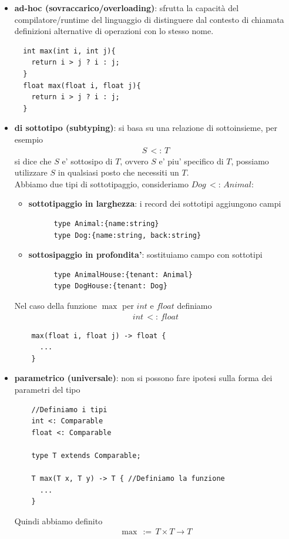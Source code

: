 \documentclass[a4paper,12pt]{article}
\begin{document}
\begin{itemize}
  \item \textbf{ad-hoc (sovraccarico/overloading)}: sfrutta la capacità del compilatore/runtime del linguaggio di
distinguere dal contesto di chiamata definizioni alternative di operazioni con
lo stesso nome.
\begin{lstlisting}
  int max(int i, int j){
    return i > j ? i : j;
  }
  float max(float i, float j){
    return i > j ? i : j;
  }
\end{lstlisting}
  \item \textbf{di sottotipo (subtyping)}: si basa su una relazione di sottoinsieme, per esempio
  \begin{align*}
    S \, <: \, T
  \end{align*}
  si dice che $S$ e' sottosipo di $T$, ovvero $S$ e' piu' specifico di $T$, possiamo utilizzare $S$ in qualsiasi posto che necessiti un $T$. \\
  Abbiamo due tipi di sottotipaggio, consideriamo $Dog \, <: \, Animal$:
  \begin{itemize}
    \item \textbf{sottotipaggio in larghezza}: i record dei sottotipi aggiungono campi
    \begin{lstlisting}
      type Animal:{name:string}
      type Dog:{name:string, back:string}
    \end{lstlisting}
    \item \textbf{sottosipaggio in profondita'}: sostituiamo campo con sottotipi
    \begin{lstlisting}
      type AnimalHouse:{tenant: Animal}
      type DogHouse:{tenant: Dog}
    \end{lstlisting}
  \end{itemize}
  Nel caso della funzione $\max$ per $int$ e $float$ definiamo
  \begin{align*}
    int \, <: \, float
  \end{align*} 
  \begin{lstlisting}
    max(float i, float j) -> float {
      ...
    }
  \end{lstlisting}
  \item \textbf{parametrico (universale)}: non si possono fare ipotesi sulla forma dei parametri del tipo 
  \begin{lstlisting}
    //Definiamo i tipi
    int <: Comparable
    float <: Comparable

    type T extends Comparable;

    T max(T x, T y) -> T { //Definiamo la funzione
      ...
    }
  \end{lstlisting}
  Quindi abbiamo definito
  \begin{align}
    \max \, := \, T \times T \rightarrow T
  \end{align}
\end{itemize}
\end{document}
